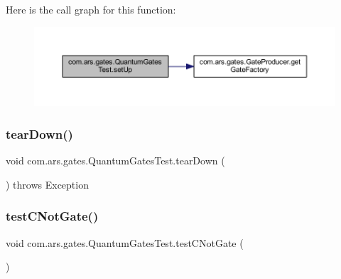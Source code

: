 Here is the call graph for this function\+:\nopagebreak
\begin{figure}[H]
\begin{center}
\leavevmode
\includegraphics[width=350pt]{classcom_1_1ars_1_1gates_1_1_quantum_gates_test_ac6bd719c947a40468a9f5fc8e7861739_cgraph}
\end{center}
\end{figure}
\hypertarget{classcom_1_1ars_1_1gates_1_1_quantum_gates_test_a9709dfe4377b2459777e814a52d8a591}{}\label{classcom_1_1ars_1_1gates_1_1_quantum_gates_test_a9709dfe4377b2459777e814a52d8a591} 
\subsubsection{\texorpdfstring{tear\+Down()}{tearDown()}}
{\footnotesize\ttfamily void com.\+ars.\+gates.\+Quantum\+Gates\+Test.\+tear\+Down (\begin{DoxyParamCaption}{ }\end{DoxyParamCaption}) throws Exception}

\hypertarget{classcom_1_1ars_1_1gates_1_1_quantum_gates_test_a9b3279f116ab4884f992562072132783}{}\label{classcom_1_1ars_1_1gates_1_1_quantum_gates_test_a9b3279f116ab4884f992562072132783} 
\subsubsection{\texorpdfstring{test\+C\+Not\+Gate()}{testCNotGate()}}
{\footnotesize\ttfamily void com.\+ars.\+gates.\+Quantum\+Gates\+Test.\+test\+C\+Not\+Gate (\begin{DoxyParamCaption}{ }\end{DoxyParamCaption})}

